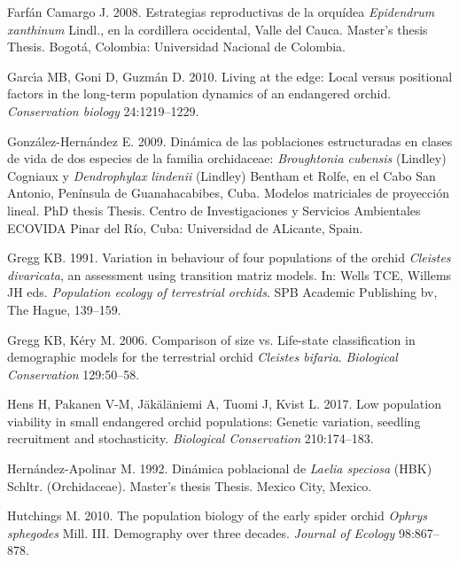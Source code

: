 \documentclass[
  12pt,
  letterpaper,
]{book}
\newlength{\cslhangindent}
\newenvironment{CSLReferences}[2] %
 {\begin{list}{}{%
  \setlength{\itemindent}{0pt}
  \setlength{\leftmargin}{0pt}
  \setlength{\parsep}{0pt}
  \ifodd #1
   \setlength{\leftmargin}{\cslhangindent}
   \setlength{\itemindent}{-1\cslhangindent}
  \fi
  \setlength{\itemsep}{#2\baselineskip}}}
 {\end{list}}
\begin{document}
\begin{CSLReferences}{1}{0}
Farfán Camargo J. 2008. Estrategias reproductivas de la orqu{í}dea
\emph{{E}pidendrum {x}anthinum} {L}indl., en la cordillera occidental,
{V}alle del {C}auca. Master's thesis Thesis. Bogot{á}, Colombia:
Universidad Nacional de Colombia.

Garcı́a MB, Goni D, Guzmán D. 2010. Living at the edge: Local versus
positional factors in the long-term population dynamics of an endangered
orchid. \emph{Conservation biology} 24:1219--1229.

González-Hernández E. 2009. Din{á}mica de las poblaciones estructuradas
en clases de vida de dos especies de la familia orchidaceae:
\emph{{B}roughtonia cubensis} ({L}indley) {C}ogniaux y
\emph{{D}endrophylax lindenii} ({L}indley) {B}entham et {R}olfe, en el
{C}abo {S}an {A}ntonio, {P}en{í}nsula de {G}uanahacabibes, {C}uba.
Modelos matriciales de proyecci{ó}n lineal. PhD thesis Thesis. Centro de
Investigaciones y Servicios Ambientales ECOVIDA Pinar del R{í}o, Cuba:
Universidad de ALicante, Spain.

Gregg KB. 1991. Variation in behaviour of four populations of the orchid
\emph{{C}leistes {d}ivaricata}, an assessment using transition matriz
models. In: Wells TCE, Willems JH eds. \emph{Population ecology of
terrestrial orchids}. SPB Academic Publishing bv, The Hague, 139--159.

Gregg KB, Kéry M. 2006. Comparison of size vs. Life-state classification
in demographic models for the terrestrial orchid \emph{{C}leistes
{b}ifaria}. \emph{Biological Conservation} 129:50--58.

Hens H, Pakanen V-M, Jäkäläniemi A, Tuomi J, Kvist L. 2017. Low
population viability in small endangered orchid populations: Genetic
variation, seedling recruitment and stochasticity. \emph{Biological
Conservation} 210:174--183.

Hernández-Apolinar M. 1992. Din{á}mica poblacional de \emph{{L}aelia
{s}peciosa} ({HBK}) {S}chltr. ({O}rchidaceae). Master's thesis Thesis.
Mexico City, Mexico.

Hutchings M. 2010. The population biology of the early spider orchid
\emph{{O}phrys {s}phegodes} {M}ill. III. Demography over three decades.
\emph{Journal of Ecology} 98:867--878.


\end{CSLReferences}
\end{document}

